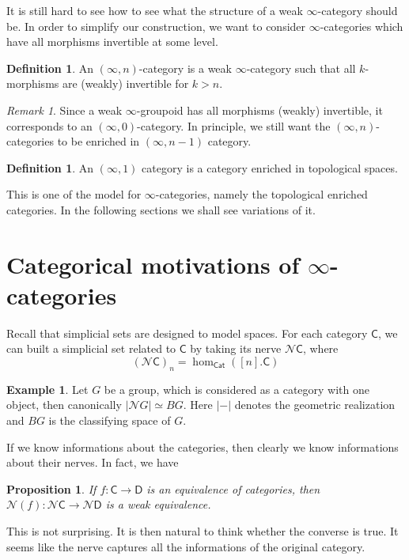 \documentclass[11pt]{amsart}
\numberwithin{equation}{section}
\newtheorem{prop}[thm]{Proposition}
\theoremstyle{definition}
\newtheorem{example}[thm]{Example}
\newtheorem{defn}[thm]{Definition}
\theoremstyle{remark}
\newtheorem{rem}[thm]{Remark}
\numberwithin{equation}{section}
\newcommand{\CC}{{\mathsf C}}
\newcommand{\CD}{{\mathsf D}}
\newcommand{\CN}{{\mathcal N}}
\newcommand{\cat}{\mathsf{Cat}}
\begin{document}
It is still hard to see how to see what the structure of a weak $\infty$-category should be. In order to simplify our construction, we want to consider $\infty$-categories which have all morphisms invertible at some level.

\begin{defn}
	An $(\infty,n)$-category is a weak $\infty$-category such that all $k$-morphisms are (weakly) invertible for $k>n$. 
\end{defn}

\begin{rem}
	Since a weak $\infty$-groupoid has all morphisms (weakly) invertible, it corresponds to an $(\infty,0)$-category. In principle, we still want the $(\infty, n)$-categories to be enriched in $(\infty, n-1)$ category.
\end{rem}
\begin{defn}
	An $(\infty,1)$ category is a category enriched in topological spaces.
\end{defn}
This is one of the model for $\infty$-categories, namely the topological enriched categories. In the following sections we shall see variations of it.
\section{Categorical motivations of $\infty$-categories}

Recall that simplicial sets are designed to model spaces. For each category $\CC$, we can built a simplicial set related to $\CC$ by taking its nerve $\CN \CC$, where
\begin{equation*}
(\CN \CC)_n = \hom_{\cat}([n]. \CC)
\end{equation*}
\begin{example}
	Let $G$ be a group, which is considered as a category with one object, then canonically $|\CN G| \simeq BG$. Here $|-|$ denotes the geometric realization and $BG$ is the classifying space of $G$.
\end{example}

If we know informations about the categories, then clearly we know informations about their nerves. In fact, we have
\begin{prop}
	If $f:\CC \to \CD$ is an equivalence of categories, then $\CN(f): \CN \CC \to \CN \CD$ is a weak equivalence.
\end{prop}
This is not surprising. It is then natural to think whether the converse is true. It seems like the nerve captures all the informations of the original category.
\end{document}
